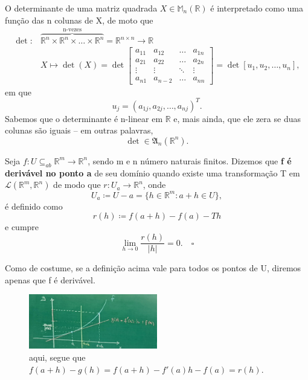 \documentclass[../analysisII_notes.tex]{subfiles}
\begin{document}
\begin{example}
	O determinante de uma matriz quadrada \(X\in \mathbb{M}_{n}(\mathbb{R})\) é interpretado como uma função das n colunas de X, de moto que
	\begin{align*}
		\det: & \overbrace{\mathbb{R}^{n}\times \mathbb{R}^{n}\times \dotsc \times \mathbb{R}^{n}}^{\text{n-vezes}}= \mathbb{R}^{n\times n}\rightarrow \mathbb{R} \\
		      & X \mapsto \det{(X)} = \det{\begin{bmatrix}
				                                   a_{11} & a_{12}  & \dotsc & a_{1n} \\
				                                   a_{21} & a_{22}  & \dotsc & a_{2n} \\
				                                   \vdots & \vdots  & \ddots & \vdots \\
				                                   a_{n1} & a_{n-2} & \dotsc & a_{nn}
			                                   \end{bmatrix}} = \det{[u_{1}, u_{2}, \dotsc , u_{n}]},
	\end{align*}
	em que
	\[
		u_{j} = (a_{1j}, a_{2j}, \dotsc , a_{nj})^{T}.
	\]
	Sabemos que o determinante é n-linear em \(\mathbb{R}\) e, mais ainda, que ele zera se duas colunas são iguais -- em outras palavras,
	\[
		\det\in \mathfrak{A}_{n}(\mathbb{R}^{n}).
	\]
\end{example}
\begin{def*}
	Seja \(f:U \subseteq_{ab}\mathbb{R}^{m} \rightarrow \mathbb{R}^{n}\), sendo m e n número naturais finitos. Dizemos que \textbf{f é derivável no ponto a} de seu domínio quando existe uma transformação T em \(\mathcal{L}(\mathbb{R}^{m}, \mathbb{R}^{n})\) de modo que \(r:U_{a}\rightarrow \mathbb{R}^{n}\), onde
	\[
		U_{a}\coloneqq U-a = \{h\in \mathbb{R}^{m}: a + h \in U\},
	\]
	é definido como
	\[
		r(h)\coloneqq f(a+h) - f(a) - Th
	\]
	e cumpre
	\[
		\lim_{h\to 0}\frac{r(h)}{|h|} = 0. \quad \square
	\]
\end{def*}
Como de costume, se a definição acima vale para todos os pontos de U, diremos apenas que f é derivável.
\begin{figure}[H]
	\begin{center}
		\includegraphics[height=0.5\textheight, width=0.5\textwidth, keepaspectratio]{./Images/derivative_22.png}
	\end{center}
	\caption{aqui, segue que \(f(a+h)-g(h) = f(a+h)-f'(a)h - f(a) = r(h)\).}
	\label{der22}
\end{figure}
\end{document}
